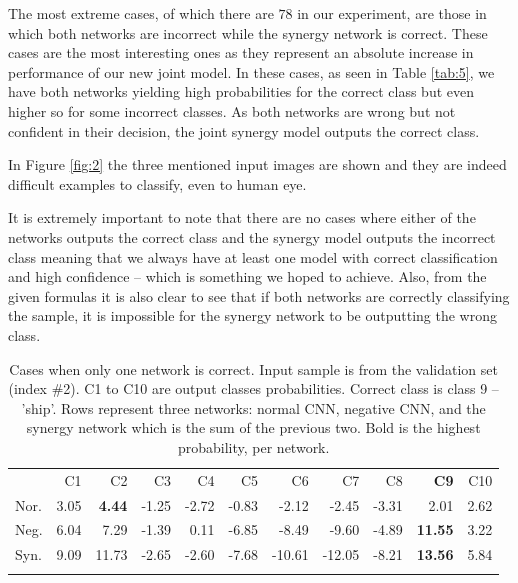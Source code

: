 \documentclass[b5paper]{book}
\begin{document}
The most extreme cases, of which there are \( 78 \) in our experiment, are those in which both networks are incorrect while the synergy network is correct. These cases are the most interesting ones as they represent an absolute increase in performance of our new joint model. In these cases, as seen in Table \ref{tab:5}, we have both networks yielding high probabilities for the correct class but even higher so for some incorrect classes. As both networks are wrong but not confident in their decision, the joint synergy model outputs the correct class.

In Figure \ref{fig:2} the three mentioned input images are shown and they are indeed difficult examples to classify, even to human eye.

It is extremely important to note that there are no cases where either of the networks outputs the correct class and the synergy model outputs the incorrect class meaning that we always have at least one model with correct classification and high confidence -- which is something we hoped to achieve. Also, from the given formulas it is also clear to see that if both networks are correctly classifying the sample, it is impossible for the synergy network to be outputting the wrong class.


\begin{table}
\centering
\caption{Cases when only one network is correct. Input sample is from the validation set (index \#2). C1 to C10 are output classes probabilities. Correct class is class 9 -- 'ship'. Rows represent three networks: normal CNN, negative CNN, and the synergy network which is the sum of the previous two. Bold is the highest probability, per network.}
\label{tab:3}
\tabcolsep=0.04cm
\begin{tabular}{lrrrrrrrrrr}
\hline\noalign{\smallskip}
 & C1 & C2 & C3 & C4 & C5 & C6 & C7 & C8 & \textbf{C9} & C10 \\
\noalign{\smallskip}\hline\noalign{\smallskip}
Nor. & 3.05 & \textbf{4.44} & -1.25 & -2.72 & -0.83 & -2.12 & -2.45 & -3.31 & 2.01 & 2.62 \\
Neg. & 6.04 & 7.29 & -1.39 & 0.11 & -6.85 & -8.49 & -9.60 & -4.89 & \textbf{11.55} & 3.22 \\
Syn. & 9.09 & 11.73 & -2.65 & -2.60 & -7.68 & -10.61 & -12.05 & -8.21 & \textbf{13.56} & 5.84 \\
\noalign{\smallskip}\hline
\end{tabular}
\end{table}
\end{document}
